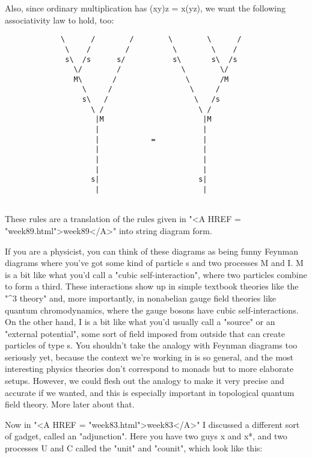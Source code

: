 Also, since ordinary multiplication has (xy)z = x(yz), we want
the following associativity law to hold, too:


\begin{verbatim}
             \      /        /        \        \      /
              \    /        /          \        \    /
              s\  /s      s/           s\       s\  /s
                \/        /              \        \/
                M\       /                \       /M 
                  \     /                  \     /
                  s\   /                    \   /s
                    \ /                      \ /
                     |M                       |M
                     |                        |
                     |            =           |
                     |                        |
                     |                        |
                     |                        |
                    s|                       s|
                     |                        |


\end{verbatim}
    
These rules are a translation of the rules given in "<A HREF = "week89.html">week89</A>" into
string diagram form.  

If you are a physicist, you can think of these diagrams as being funny
Feynman diagrams where you've got some kind of particle s and two
processes M and I.  M is a bit like what you'd call a "cubic
self-interaction", where two particles combine to form a third.  These
interactions show up in simple textbook theories like the "\phi ^{3} theory"
and, more importantly, in nonabelian gauge field theories like quantum
chromodynamics, where the gauge bosons have cubic self-interactions.  On 
the other hand, I is a bit like what you'd usually call a "source" or an 
"external potential", some sort of field imposed from outside that can 
create particles of type s.  You shouldn't take the analogy with Feynman
diagrams too seriously yet, because the context we're working in is so
general, and the most interesting physics theories don't correspond to
monads but to more elaborate setups.  However, we could flesh out the
analogy to make it very precise and accurate if we wanted, and this is
especially important in topological quantum field theory.  More later
about that.

Now in "<A HREF = "week83.html">week83</A>" I discussed a different sort of gadget, called an
"adjunction".   Here you have two guys x and x*, and two
processes  U and C called the "unit" and "counit", which look like
this:

